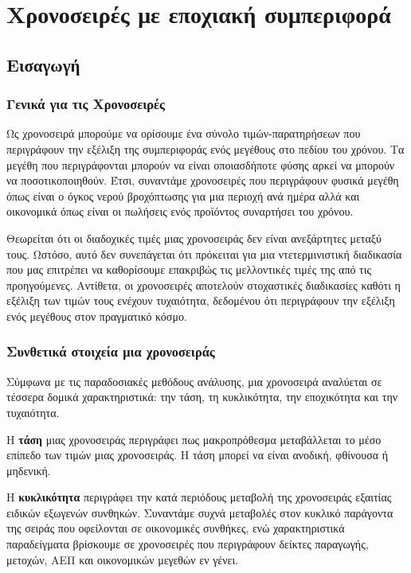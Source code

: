 \chapter{Χρονοσειρές με εποχιακή συμπεριφορά}
\label{chap2}

\section{Εισαγωγή}
\subsection{Γενικά για τις Χρονοσειρές}
Ως χρονοσειρά μπορούμε να ορίσουμε ένα σύνολο τιμών-παρατηρήσεων που περιγράφουν την εξέλιξη της συμπεριφοράς ενός μεγέθους στο πεδίου του χρόνου. Τα μεγέθη που περιγράφονται μπορούν να είναι οποιασδήποτε φύσης αρκεί να μπορούν να ποσοτικοποιηθούν. Έτσι, συναντάμε χρονοσειρές που περιγράφουν φυσικά μεγέθη όπως είναι ο όγκος νερού βροχόπτωσης για μια περιοχή ανά ημέρα αλλά και οικονομικά όπως είναι οι πωλήσεις ενός προϊόντος συναρτήσει του χρόνου. 

Θεωρείται ότι οι διαδοχικές τιμές μιας χρονοσειράς δεν είναι ανεξάρτητες μεταξύ τους. Ωστόσο, αυτό δεν συνεπάγεται ότι πρόκειται για μια ντετερμινιστική διαδικασία που μας επιτρέπει να καθορίσουμε επακριβώς τις μελλοντικές τιμές της από τις προηγούμενες. Αντίθετα, οι χρονοσειρές αποτελούν στοχαστικές διαδικασίες καθότι η εξέλιξη των τιμών τους ενέχουν τυχαιότητα, δεδομένου ότι περιγράφουν την εξέλιξη ενός μεγέθους στον πραγματικό κόσμο.

\subsection{Συνθετικά στοιχεία μια χρονοσειράς}

Σύμφωνα με τις παραδοσιακές μεθόδους ανάλυσης, μια χρονοσειρά αναλύεται σε τέσσερα δομικά χαρακτηριστικά: την τάση, τη κυκλικότητα, την εποχικότητα και την τυχαιότητα. 

Η \textbf{τάση} μιας χρονοσειράς περιγράφει πως μακροπρόθεσμα μεταβάλλεται το μέσο επίπεδο των τιμών μιας χρονοσειράς. Η τάση μπορεί να είναι ανοδική, φθίνουσα ή μηδενική.

H \textbf{κυκλικότητα} περιγράφει την κατά περιόδους μεταβολή της χρονοσειράς εξαιτίας ειδικών εξωγενών συνθηκών. Συναντάμε συχνά μεταβολές στον κυκλικό παράγοντα της σειράς που οφείλονται σε οικονομικές συνθήκες, ενώ χαρακτηριστικά παραδείγματα βρίσκουμε σε χρονοσειρές που περιγράφουν δείκτες παραγωγής, μετοχών, ΑΕΠ και οικονομικών μεγεθών εν γένει.

